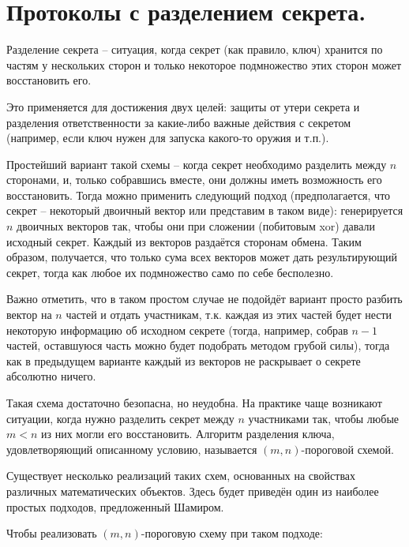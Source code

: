 \section{Протоколы с разделением секрета.}

Разделение секрета -- ситуация, когда секрет (как правило, ключ) хранится по частям у нескольких сторон и только некоторое подмножество этих сторон может восстановить его. 

Это применяется для достижения двух целей: защиты от утери секрета и разделения ответственности за какие-либо важные действия с секретом (например, если ключ нужен для запуска какого-то оружия и т.п.).

Простейший вариант такой схемы -- когда секрет необходимо разделить между $n$ сторонами, и, только собравшись вместе, они должны иметь возможность его восстановить. Тогда можно применить следующий подход (предполагается, что секрет -- некоторый двоичный вектор или представим в таком виде): генерируется $n$ двоичных векторов так, чтобы они при сложении (побитовым xor) давали исходный секрет. Каждый из векторов раздаётся сторонам обмена. Таким образом, получается, что только сума всех векторов может дать результирующий секрет, тогда как любое их подмножество само по себе бесполезно.

Важно отметить, что в таком простом случае не подойдёт вариант просто разбить вектор на $n$ частей и отдать участникам, т.к. каждая из этих частей будет нести некоторую информацию об исходном секрете (тогда, например, собрав $n - 1$ частей, оставшуюся часть можно будет подобрать методом грубой силы), тогда как в предыдущем варианте каждый из векторов не раскрывает о секрете абсолютно ничего. 

Такая схема достаточно безопасна, но неудобна. На практике чаще возникают ситуации, когда нужно разделить секрет между $n$ участниками так, чтобы любые $m < n$ из них могли его восстановить. Алгоритм разделения ключа, удовлетворяющий описанному условию, называется $(m, n)$-пороговой схемой. 

Существует несколько реализаций таких схем, основанных на свойствах различных математических объектов. Здесь будет приведён один из наиболее простых подходов, предложенный Шамиром. 

Чтобы реализовать $(m, n)$-пороговую схему при таком подходе:


